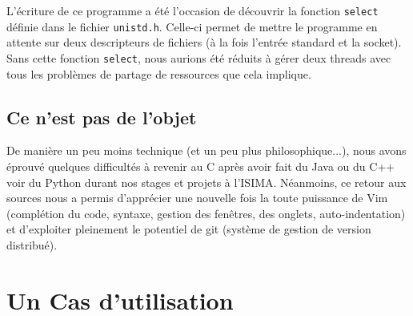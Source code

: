 L'écriture de ce programme a été l'occasion de découvrir la fonction \verb|select| définie dans le fichier \verb|unistd.h|. Celle-ci permet de mettre le programme en attente sur deux descripteurs de fichiers (à la fois l'entrée standard et la socket). Sans cette fonction \verb|select|, nous aurions été réduits à gérer deux threads avec tous les problèmes de partage de ressources que cela implique.

\subsection{Ce n'est pas de l'objet}

De manière un peu moins technique (et un peu plus philosophique...), nous avons éprouvé quelques difficultés à revenir au C après avoir fait du Java ou du C++ voir du Python durant nos stages et projets à l'ISIMA. Néanmoins, ce retour aux sources nous a permis d'apprécier une nouvelle fois la toute puissance de Vim (complétion du code, syntaxe, gestion des fenêtres, des onglets, auto-indentation) et d'exploiter pleinement le potentiel de git (système de gestion de version distribué).

\section{Un Cas d'utilisation}

